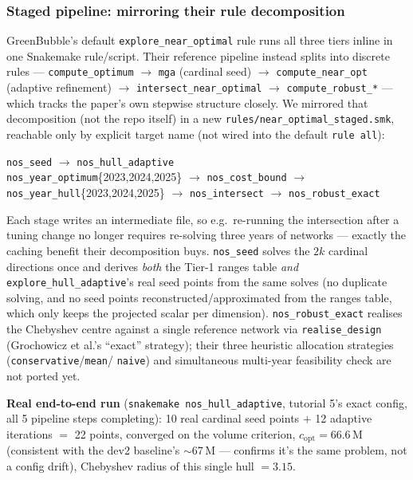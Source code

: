 \documentclass[11pt]{article}
\begin{document}
\subsubsection{Staged pipeline: mirroring their rule decomposition}
GreenBubble's default \texttt{explore\_near\_optimal} rule runs all three
tiers inline in one Snakemake rule/script. Their reference pipeline instead
splits into discrete rules --- \texttt{compute\_optimum} $\to$ \texttt{mga}
(cardinal seed) $\to$ \texttt{compute\_near\_opt} (adaptive refinement)
$\to$ \texttt{intersect\_near\_optimal} $\to$ \texttt{compute\_robust\_*}
--- which tracks the paper's own stepwise structure closely. We mirrored
that decomposition (not the repo itself) in a new
\texttt{rules/near\_optimal\_staged.smk}, reachable only by explicit target
name (not wired into the default \texttt{rule all}):

\begin{center}
\small
\texttt{nos\_seed} $\to$ \texttt{nos\_hull\_adaptive}\\[4pt]
\texttt{nos\_year\_optimum}\{2023,2024,2025\} $\to$ \texttt{nos\_cost\_bound}
$\to$ \texttt{nos\_year\_hull}\{2023,2024,2025\} $\to$ \texttt{nos\_intersect}
$\to$ \texttt{nos\_robust\_exact}
\end{center}

Each stage writes an intermediate file, so e.g.\ re-running the intersection
after a tuning change no longer requires re-solving three years of networks
--- exactly the caching benefit their decomposition buys. \texttt{nos\_seed}
solves the $2k$ cardinal directions once and derives \emph{both} the Tier-1
ranges table \emph{and} \texttt{explore\_hull\_adaptive}'s real seed points
from the same solves (no duplicate solving, and no seed points
reconstructed/approximated from the ranges table, which only keeps the
projected scalar per dimension). \texttt{nos\_robust\_exact} realises the
Chebyshev centre against a single reference network via
\texttt{realise\_design} (Grochowicz et al.'s ``exact'' strategy); their
three heuristic allocation strategies (\texttt{conservative}/\texttt{mean}/
\texttt{naive}) and simultaneous multi-year feasibility check are not
ported yet.

\textbf{Real end-to-end run} (\texttt{snakemake nos\_hull\_adaptive},
tutorial 5's exact config, all 5 pipeline steps completing): 10 real
cardinal seed points $+$ 12 adaptive iterations $=$ 22 points, converged on
the volume criterion, $c_{\mathrm{opt}} = 66.6\,\text{M}$ (consistent with
the dev2 baseline's $\sim$67\,M --- confirms it's the same problem, not a
config drift), Chebyshev radius of this single hull $= 3.15$.
\end{document}
